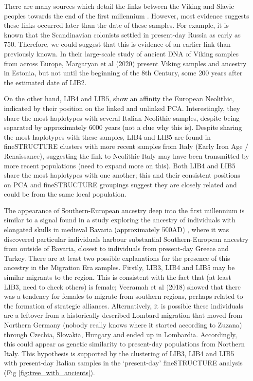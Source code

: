 There are many sources which detail the links between the Viking and Slavic peoples towards the end of the first millennium \cite{duczko2004viking, peterson2016vikings}. However, most evidence suggests these links occurred later than the date of these samples. For example, it is known that the Scandinavian colonists settled in present-day Russia as early as 750. Therefore, we could suggest that this is evidence of an earlier link than previously known. In their large-scale study of ancient DNA of Viking samples from across Europe, Margaryan et al (2020) present Viking samples and ancestry in Estonia, but not until the beginning of the 8th Century, some 200 years after the estimated date of LIB2.  

On the other hand, LIB4 and LIB5, show an affinity the European Neolithic, indicated by their position on the linked and unlinked PCA. Interestingly, they share the most haplotypes with several Italian Neolithic samples, despite being separated by approximately 6000 years (not a clue why this is). Despite sharing the most haplotypes with these samples, LIB4 and LIB5 are found in fineSTRUCTURE clusters with more recent samples from Italy (Early Iron Age / Renaissance), suggesting the link to Neolithic Italy may have been transmitted by more recent populations (need to expand more on this). Both LIB4 and LIB5 share the most haplotypes with one another; this and their consistent positions on PCA and fineSTRUCTURE groupings suggest they are closely related and could be from the same local population. 

The appearance of Southern-European ancestry deep into the first millennium is similar to a signal found in a study exploring the ancestry of individuals with elongated skulls in medieval Bavaria (approximately 500AD) \cite{Veeramah2018}, where it was discovered particular individuals harbour substantial Southern-European ancestry from outside of Bavaria, closest to individuals from present-day Greece and Turkey. There are at least two possible explanations for the presence of this ancestry in the Migration Era samples. Firstly, LIB3, LIB4 and LIB5 may be similar migrants to the region. This is consistent with the fact that (at least LIB3, need to check others) is female; Veeramah et al (2018) showed that there was a tendency for females to migrate from southern regions, perhaps related to the formation of strategic alliances. Alternatively, it is possible these individuals are a leftover from a historically described Lombard migration that moved from Northern Germany (nobody really knows where it started according to Zuzana) through Czechia, Slovakia, Hungary and ended up in Lombardia. Accordingly, this could appear as genetic similarity to present-day populations from Northern Italy. This hypothesis is supported by the clustering of LIB3, LIB4 and LIB5 with present-day Italian samples in the `present-day' fineSTRUCTURE analysis (Fig \ref{fig:tree_with_ancients}).

